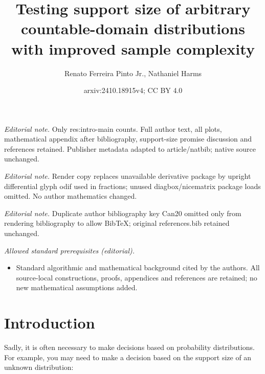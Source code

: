 \documentclass[10pt,a4paper]{article}
\title{Testing support size of arbitrary countable-domain distributions with improved sample complexity}
\author{Renato Ferreira Pinto Jr., Nathaniel Harms}
\date{arxiv:2410.18915v4; CC BY 4.0}
\begin{document}
\maketitle
\noindent\textit{Editorial note.} Only res:intro-main counts. Full author text, all plots, mathematical appendix after bibliography, support-size promise discussion and references retained. Publisher metadata adapted to article/natbib; native source unchanged.\par\medskip
\noindent\textit{Editorial note.} Render copy replaces unavailable derivative package by upright differential glyph odif used in fractions; unused diagbox/nicematrix package loads omitted. No author mathematics changed.\par\medskip
\noindent\textit{Editorial note.} Duplicate author bibliography key Can20 omitted only from rendering bibliography to allow BibTeX; original references.bib retained unchanged.\par\medskip
\noindent\textit{Allowed standard prerequisites (editorial).}\begin{itemize}
\item Standard algorithmic and mathematical background cited by the authors. All source-local constructions, proofs, appendices and references are retained; no new mathematical assumptions added.
\end{itemize}\medskip
\section{Introduction}

Sadly, it is often necessary to make decisions based on probability distributions. For example, you
may need to make a decision based on the support size of an unknown distribution:
\end{document}
